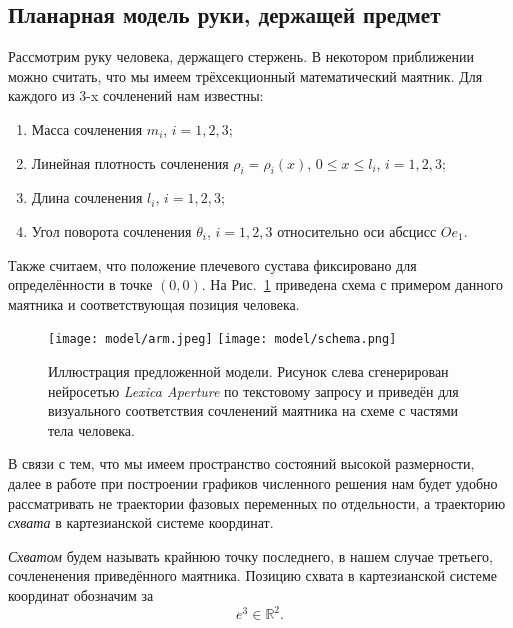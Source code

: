 \documentclass[../../doc.tex]{subfiles}
\begin{document}
    \subsection{Планарная модель руки, держащей предмет}
    
    Рассмотрим руку человека, держащего стержень.
    В некотором приближении можно считать, что мы имеем трёхсекционный математический маятник.
    Для каждого из $3$-x сочленений нам известны:
    \begin{enumerate}\itemsep0em 
        \item Масса сочленения $m_i$, $i=1,2,3$;
        \item Линейная плотность сочленения $\rho_i = \rho_i(x)$, $0 \leqslant x \leqslant l_i$, $i=1,2,3$;
        \item Длина сочленения $l_i$, $i=1,2,3$;
        \item Угол поворота сочленения $\theta_i$, $i=1,2,3$ относительно оси абсцисс $Oe_1$.
    \end{enumerate}

    Также считаем, что положение плечевого сустава фиксировано для определённости в точке $(0,0)$.
    На Рис.~\ref{img:arm-model} приведена схема с примером данного маятника и соответствующая позиция человека.

    \vfill
    \begin{figure}[h]
        \begin{center}
            \texttt{[image: model/arm.jpeg]}
            \hfil
            \texttt{[image: model/schema.png]}
        \end{center}
        \caption{
            Иллюстрация предложенной модели.
            Рисунок слева сгенерирован нейросетью \textit{Lexica Aperture} по текстовому запросу и приведён для визуального соответствия сочленений маятника на схеме с частями тела человека.
        }
        \label{img:arm-model}
    \end{figure}

    В связи с тем,
    что мы имеем пространство состояний высокой размерности,
    далее в работе при построении графиков численного решения
    нам будет удобно рассматривать не траектории фазовых переменных по отдельности,
    а траекторию \textit{схвата} в картезианской системе координат.

    \begin{definition}
        \textit{Схватом} будем называть крайнюю точку последнего, в нашем случае третьего, сочлененения приведённого маятника.
        Позицию схвата в картезианской системе координат обозначим за
        \begin{equation*}
            e^{3} \in \mathbb{R}^{2}.
        \end{equation*}
    \end{definition}
\end{document}
